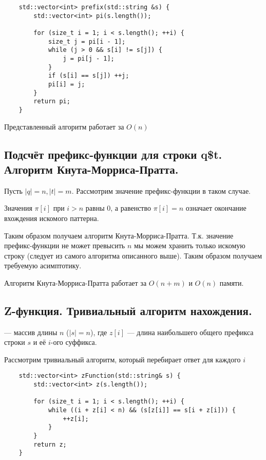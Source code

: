 \begin{lstlisting}
	std::vector<int> prefix(std::string &s) {
		std::vector<int> pi(s.length());

		for (size_t i = 1; i < s.length(); ++i) {
			size_t j = pi[i - 1];
			while (j > 0 && s[i] != s[j]) {
				j = pi[j - 1];
			}
			if (s[i] == s[j]) ++j;
			pi[i] = j;
		}
		return pi;
	}
\end{lstlisting}

\begin{remark}
	Представленный алгоритм работает за $O(n)$
\end{remark}

\subsection{Подсчёт префикс-функции для строки q\$t. Алгоритм Кнута-Морриса-Пратта.}

Пусть $\left| q \right| = n, \left| t \right| = m$. Рассмотрим значение префикс-функции в таком случае.

\begin{remark}
	Значения $\pi [i]$ при $i > n$ равны $0$, а равенство $\pi[i] = n$ означает окончание вхождения искомого
	паттерна.
\end{remark}

Таким образом получаем алгоритм Кнута-Морриса-Пратта. Т.к. значение префикс-функции не может превысить $n$ мы
можем хранить только искомую строку (следует из самого алгоритма описанного выше). Таким образом получаем требуемую асимптотику.

\begin{remark}
	Алгоритм Кнута-Морриса-Пратта работает за $O(n+m)$ и $O(n)$ памяти.
\end{remark}

\subsection{Z-функция. Тривиальный алгоритм нахождения.}

\begin{definition}
	 --- массив длины $n$ ($\left| s \right| = n$), где $z[i]$ --- длина
  наибольшего общего
	префикса строки $s$ и её $i$-ого суффикса.
\end{definition}

Рассмотрим тривиальный алгоритм, который перебирает ответ для каждого $i$

\begin{lstlisting}
	std::vector<int> zFunction(std::string& s) {
		std::vector<int> z(s.length());

		for (size_t i = 1; i < s.length(); ++i) {
			while ((i + z[i] < n) && (s[z[i]] == s[i + z[i])) {
				++z[i];
			}
		}
		return z;
	}
\end{lstlisting}

